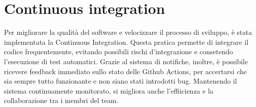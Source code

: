 



\section{Continuous integration}
Per migliorare la qualità del software e velocizzare il processo di sviluppo, è stata implementata la Continuous Integration.
Questa pratica permette di integrare il codice frequentemente, evitando possibili rischi d'integrazione e consetendo 
l'esecuzione di test automatici. Grazie al sistema di notifiche, inoltre, è possibile ricevere feedback immediato sullo stato delle Github Actions,
per accertarsi che sia sempre tutto funzionante e non siano stati introdotti bug. Mantenendo il sistema continuamente monitorato,
si migliora anche l'effiicienza e la collaborazione tra i membri del team.








